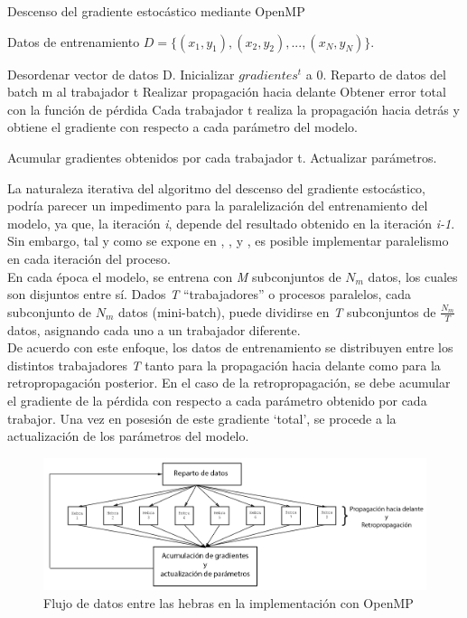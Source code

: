 \begin{algorithm}[H]
	\caption{Descenso del gradiente estocástico mediante OpenMP} 
	\begin{algorithmic}
		\State Datos de entrenamiento $D=\{(x_1, y_1), (x_2, y_2), ..., (x_N, y_N)\}$.
		
		\State Desordenar vector de datos D.
		\State Inicializar $gradientes^t$ a 0.
		\State Reparto de datos del batch m al trabajador t
		\State Realizar propagación hacia delante
		\State Obtener error total con la función de pérdida
		\State Cada trabajador t realiza la propagación hacia 
		\State detrás y obtiene el gradiente con respecto a 
		\State cada parámetro del modelo.
		
		\State Acumular gradientes obtenidos por cada trabajador t.
		\State Actualizar parámetros.
		
		\EndFor
		\EndFor
		\EndFor
	\end{algorithmic}
\end{algorithm}

La naturaleza iterativa del algoritmo del descenso del gradiente estocástico, podría parecer un impedimento para la paralelización del entrenamiento del modelo, ya que, la iteración \textit{i}, depende del resultado obtenido en la iteración \textit{i-1}. Sin embargo, tal y como se expone en \cite{CNN_parallel_Stanford}, \cite{CNN_parallel_International_Conference}, y \cite{CNN_parallel_Ome_Weird_Trick}, es posible implementar paralelismo en cada iteración del proceso. \\
En cada época el modelo, se entrena con \textit{M} subconjuntos de $N_m$ datos, los cuales son disjuntos entre sí. Dados \textit{T} ``trabajadores'' o procesos paralelos, cada subconjunto de $N_m$ datos (mini-batch), puede dividirse en \textit{T} subconjuntos de $\frac{N_m}{T}$ datos, asignando cada uno a un trabajador diferente.\\
De acuerdo con este enfoque, los datos de entrenamiento se distribuyen entre los distintos trabajadores \textit{T} tanto para la propagación hacia delante como para la retropropagación posterior. En el caso de la retropropagación, se debe acumular el gradiente de la pérdida con respecto a cada parámetro obtenido por cada trabajor. Una vez en posesión de este gradiente `total', se procede a la actualización de los parámetros del modelo.

\begin{figure}[H]
	\centering
	\includegraphics[width=1.2\linewidth]{imagenes/openmp_flujo.jpg} 
	\caption{Flujo de datos entre las hebras en la implementación con OpenMP}
	\label{fig:openmp_flujo}
\end{figure}

